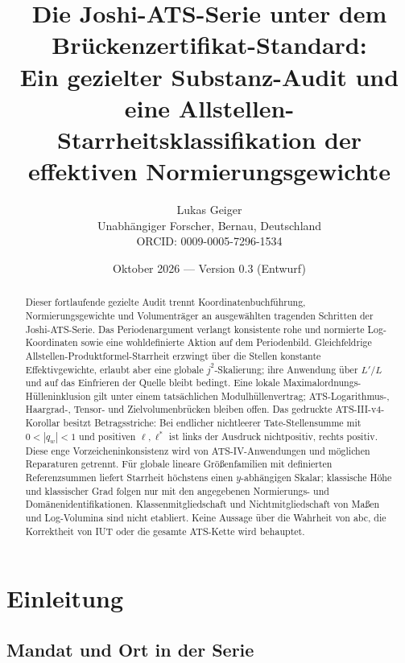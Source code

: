 \documentclass[11pt,a4paper]{article}
\title{Die Joshi-ATS-Serie unter dem Brückenzertifikat-Standard:\\Ein gezielter Substanz-Audit und eine Allstellen-\\Starrheitsklassifikation der effektiven Normierungsgewichte}
\author{Lukas Geiger\\\small Unabhängiger Forscher, Bernau, Deutschland\\\small ORCID: 0009-0005-7296-1534}
\date{Oktober 2026 --- Version 0.3 (Entwurf)}
\theoremstyle{definition}
\theoremstyle{remark}
\begin{document}
\maketitle

\begin{abstract}
Dieser fortlaufende gezielte Audit trennt Koordinatenbuchführung,
Normierungsgewichte und Volumenträger an ausgewählten tragenden Schritten
der Joshi-ATS-Serie. Das Periodenargument verlangt konsistente rohe und
normierte Log-Koordinaten sowie eine wohldefinierte Aktion auf dem
Periodenbild. Gleichfeldrige Allstellen-Produktformel-Starrheit erzwingt
über die Stellen konstante Effektiv\-gewichte, erlaubt aber eine globale
$j^2$-Skalierung; ihre Anwendung über $L'/L$ und auf das Einfrieren der
Quelle bleibt bedingt. Eine lokale Maximalordnungs-Hülleninklusion gilt
unter einem tatsächlichen Modulhüllenvertrag; ATS-Logarithmus-, Haargrad-,
Tensor- und Zielvolumenbrücken bleiben offen. Das gedruckte ATS-III-v4-Korollar
besitzt Betragsstriche: Bei endlicher nichtleerer Tate-Stellensumme mit
$0<|q_w|<1$ und positiven $\ell,\ell^*$ ist links der Ausdruck
nichtpositiv, rechts positiv. Diese enge Vorzeicheninkonsistenz wird von
ATS-IV-Anwendungen und möglichen Reparaturen getrennt. Für globale lineare
Größenfamilien mit definierten Referenzsummen liefert Starrheit höchstens
einen $y$-abhängigen Skalar; klassische Höhe und klassischer Grad folgen
nur mit den angegebenen Normierungs- und Domänenidentifikationen.
Klassenmitgliedschaft und Nichtmitgliedschaft von Maßen und Log-Volumina
sind nicht etabliert. Keine Aussage über die Wahrheit von abc, die
Korrektheit von IUT oder die gesamte ATS-Kette wird behauptet.
\end{abstract}

\clearpage
\tableofcontents
\clearpage

\section{Einleitung}\label{sec:intro}

\subsection{Mandat und Ort in der Serie}
\end{document}
